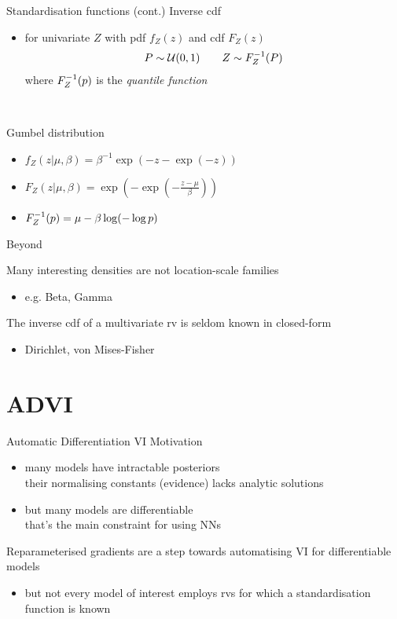 \documentclass[14pt]{beamer}
\begin{document}
\begin{frame}{Standardisation functions (cont.)}
	Inverse cdf
	\begin{itemize}
		\item for univariate $Z$ with pdf $f_Z(z)$ and cdf $F_Z(z)$
		\begin{equation*}
		\begin{aligned}
			P \sim \mathcal U(0, 1) \qquad Z \sim {F}^{-1}_Z(P) 
		\end{aligned}		
		\end{equation*}
		where ${F}^{-1}_Z(p)$ is the \emph{quantile function}
	\end{itemize}
	
	~ \pause
	
	Gumbel distribution
	\begin{itemize}
		\item $f_Z(z|\mu, \beta) = \beta^{-1}\exp(-z -\exp(-z))$ 
		\item $F_Z(z|\mu, \beta) = \exp(-\exp(-\frac{z-\mu}{\beta}))$
		\item ${F}^{-1}_Z(p) = \mu - \beta \log( - \log p)$
	\end{itemize}
\end{frame}

\begin{frame}{Beyond}

	Many interesting densities are not location-scale families
	\begin{itemize}
		\item e.g. Beta, Gamma
	\end{itemize}
	
	The inverse cdf of a multivariate rv is seldom known in closed-form
	\begin{itemize}
		\item Dirichlet, von Mises-Fisher
	\end{itemize}

\end{frame}

\section{ADVI}

\begin{frame}{Automatic Differentiation VI}
	Motivation
	\begin{itemize}
		\item many models have intractable posteriors\\
		their normalising constants (evidence) lacks analytic solutions \pause
		\item but many models are differentiable\\
		that's the main constraint for using NNs \pause
	\end{itemize}

	Reparameterised gradients are a step towards automatising VI for differentiable models \pause
	\begin{itemize}
		\item but not every model of interest employs rvs for which a standardisation function is known
	\end{itemize}
	
\end{frame}
\end{document}
